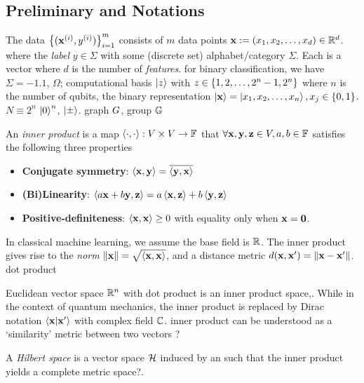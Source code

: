 \subsection{Preliminary and Notations}
The data $\qty{(\vb{x}^{(i)}, y^{(i)})}^{m}_{i=1}$ consists of $m$ data points $\vb{x}:= (x_1,x_2,\dots,x_d) \in \mathbb{R}^d$.
where the \emph{label} $y\in\Sigma$ with some (discrete set) alphabet/category $\Sigma$. 
Each is a vector where $d$ is the number of \emph{features}.
for binary classification, we have $\Sigma=\qty{-1,1}$,
$\Omega$;
computational basis $\ket{z}$ with $z\in \qty{1,2,\dots,2^n-1,2^n}$ where $n$ is the number of qubits,
the binary representation $\ket{\vb{x}}=\ket{x_1,x_2,\dots,x_n},x_j\in \qty{0,1}$. $N \equiv 2^n$
$\ket{0}^n$, $\ket{\pm}$.
graph $G$, group $\mathbb{G}$
\begin{definition}\label{def:inner_product}
	An \emph{inner product} is a map
	$\expval{\cdot,\cdot}: V \times V \to \mathbb{F}$
	that $\forall \vb{x},\vb{y},\vb{z}\in V,a,b\in\mathbb{F}$
	satisfies the following three properties 
	\begin{itemize}
		\item \textbf{Conjugate symmetry}:
		$\expval{\vb{x},\vb{y}}=\overline{\expval{\vb{y},\vb{x}}}$
		\item \textbf{(Bi)Linearity}:
		$\expval{a\vb{x}+b\vb{y},\vb{z}}=a\expval{\vb{x},\vb{z}}+b\expval{\vb{y},\vb{z}}$
		\item \textbf{Positive-definiteness}:
		$\expval{\vb{x},\vb{x}}\ge 0$ with equality only when $\vb{x}=\vb{0}$.
	\end{itemize}
	In classical machine learning, we assume the base field is $\mathbb{R}$.
	The inner product gives rise to the \emph{norm} $\norm{\vb{x}}=\sqrt{\expval{\vb{x},\vb{x}}}$,
	and a distance metric $d(\vb{x},\vb{x}')=\norm{\vb{x}-\vb{x}'}$.
	dot product
\end{definition}
Euclidean vector space $\mathbb{R}^n$ with dot product is an inner product space,.
While in the context of quantum mechanics,
the inner product is replaced by 
Dirac notation $\braket{\vb{x}}{\vb{x}'}$ with complex field $\mathbb{C}$.
inner product can be understood as a `similarity' metric between two vectors ?
\begin{definition}\label{def:hilbert_space}
	A \emph{Hilbert space} is a vector space $\mathcal{H}$ induced by an 
	such that the inner product yields a complete metric space?.
\end{definition}

